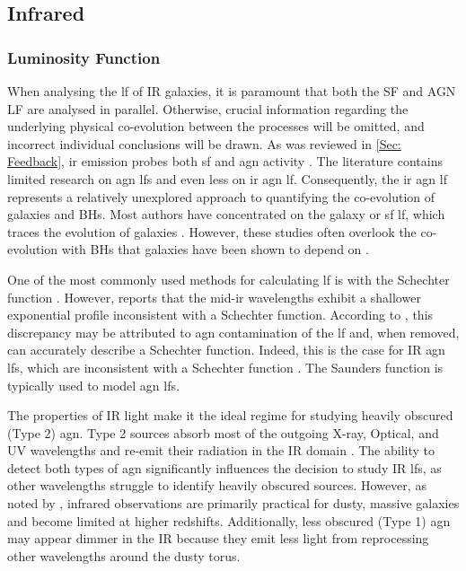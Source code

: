 \subsection{Infrared}
\subsubsection{Luminosity Function}
When analysing the \gls{lf} of IR galaxies, it is paramount that both the SF and AGN LF are analysed in parallel. Otherwise, crucial information regarding the underlying physical co-evolution between the processes will be omitted, and incorrect individual conclusions will be drawn. As was reviewed in \cref{Sec: Feedback}, \gls{ir} emission probes both \gls{sf} and \gls{agn} activity \citep{fu_decomposing_2010}. The literature contains limited research on \gls{agn} \gls{lf}s and even less on \gls{ir} \gls{agn} \gls{lf}. Consequently, the \gls{ir} \gls{agn} \gls{lf} represents a relatively unexplored approach to quantifying the co-evolution of galaxies and BHs. Most authors have concentrated on the galaxy or \gls{sf} \gls{lf}, which traces the evolution of galaxies \citep{cool_galaxy_2012, tempel_tracing_2011}. However, these studies often overlook the co-evolution with BHs \citep{fotopoulou_5-10_2016, symeonidis_agn_2021, finkelstein_coevolution_2022} that galaxies have been shown to depend on \citep{hopkins_cosmological_2008, fiore_agn_2017}.

One of the most commonly used methods for calculating \gls{lf} is with the Schechter function \citep{schechter_analytic_1976}. However, \cite{wu_mid-infrared_2011} reports that the mid-\gls{ir} wavelengths exhibit a shallower exponential profile inconsistent with a Schechter function. According to \cite{fu_decomposing_2010}, this discrepancy may be attributed to \gls{agn} contamination of the \gls{lf} and, when removed, can accurately describe a Schechter function. Indeed, this is the case for IR \gls{agn} \gls{lf}s, which are inconsistent with a Schechter function \citep{symeonidis_what_2019}. The Saunders function \citep{saunders_60-mum_1990} is typically used to model \gls{agn} \gls{lf}s. 

The properties of IR light make it the ideal regime for studying heavily obscured (Type 2) \gls{agn}. Type 2 sources absorb most of the outgoing X-ray, Optical, and UV wavelengths and re-emit their radiation in the IR domain \citep{fu_decomposing_2010, wu_mid-infrared_2011, gruppioni_modelling_2011, assef_mid-ir-_2011, toba_9_2013, oconnor_luminosity_2016, brown_infrared_2019, symeonidis_agn_2021}. The ability to detect both types of \gls{agn} significantly influences the decision to study IR \gls{lf}s, as other wavelengths struggle to identify heavily obscured sources. However, as noted by \cite{katsianis_evolution_2017}, infrared observations are primarily practical for dusty, massive galaxies and become limited at higher redshifts. Additionally, less obscured (Type 1) \gls{agn} may appear dimmer in the IR because they emit less light from reprocessing other wavelengths around the dusty torus. 

